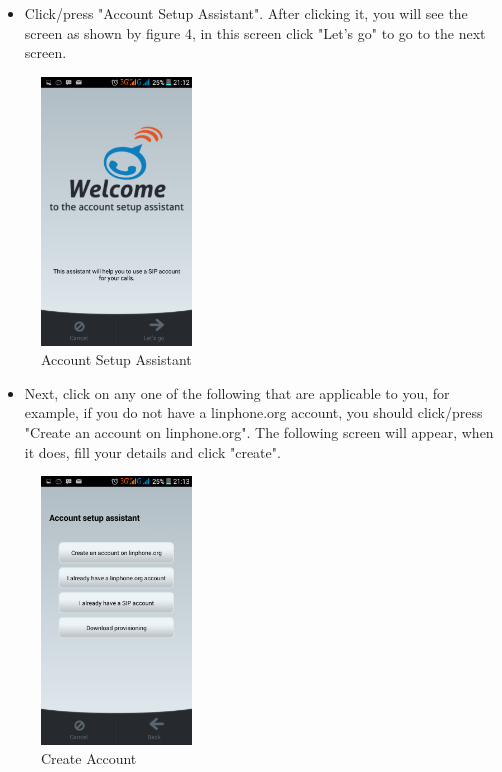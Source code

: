 \documentclass[a4paper]{article}
\begin{document}
\begin{itemize}
\item Click/press "Account Setup Assistant".  After clicking it, you will see the screen as shown by figure 4, in this screen click "Let's go" to go to the next screen.
\end{itemize}

\begin{figure}[h]
\centering
\includegraphics[scale=0.30, width=40mm]{./pictures/welcome.png}
\caption{\label{fig:Agile}Account Setup Assistant}
\end{figure}

\begin{itemize}
\item Next, click on any  one of the following that are applicable to you, for example, if you do not have a linphone.org account, you should click/press "Create an account on linphone.org". The following screen will appear, when it does, fill your details and click "create".
\end{itemize}

\begin{figure}[h]
\centering
\includegraphics[scale=0.30, width=40mm]{./pictures/options.png}
\caption{\label{fig:Agile}Create Account}
\end{figure}
\end{document}
